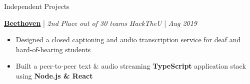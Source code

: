 \documentclass{resume/resume}
\begin{document}
\begin{rSection}{Independent Projects}

  
  \href{https://devpost.com/software/beethoven-t9ud86}{\bf Beethoven} | {\em 2nd Place out of 30 teams
  \hfill HackTheU} | {\em Aug 2019}
  \vspace{-6pt}
  \begin{itemize}[nosep]
    \item Designed a closed captioning and audio transcription service for deaf and hard-of-hearing students
    \item Built a peer-to-peer text \& audio streaming {\bf TypeScript} application stack using {\bf Node.js \& React}
  \end{itemize}

  
  

\end{rSection}
\end{document}
